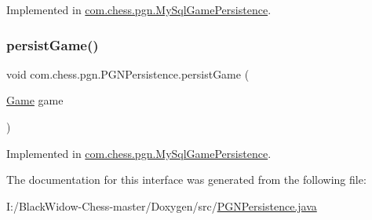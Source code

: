 Implemented in \mbox{\hyperlink{classcom_1_1chess_1_1pgn_1_1_my_sql_game_persistence_a05fad44f338992121a0ec6c474fddf93}{com.\+chess.\+pgn.\+My\+Sql\+Game\+Persistence}}.

\mbox{\label{interfacecom_1_1chess_1_1pgn_1_1_p_g_n_persistence_a144870869633d521938c6de252a9d653}} 
\subsubsection{\texorpdfstring{persistGame()}{persistGame()}}
{\footnotesize\ttfamily void com.\+chess.\+pgn.\+P\+G\+N\+Persistence.\+persist\+Game (\begin{DoxyParamCaption}\item[{\mbox{\hyperlink{classcom_1_1chess_1_1pgn_1_1_game}{Game}}}]{game }\end{DoxyParamCaption})}



Implemented in \mbox{\hyperlink{classcom_1_1chess_1_1pgn_1_1_my_sql_game_persistence_a7faec01db9c72e7ef04b63a982013c21}{com.\+chess.\+pgn.\+My\+Sql\+Game\+Persistence}}.



The documentation for this interface was generated from the following file\+:\begin{DoxyCompactItemize}
\item 
I\+:/\+Black\+Widow-\/\+Chess-\/master/\+Doxygen/src/\mbox{\hyperlink{_p_g_n_persistence_8java}{P\+G\+N\+Persistence.\+java}}\end{DoxyCompactItemize}
